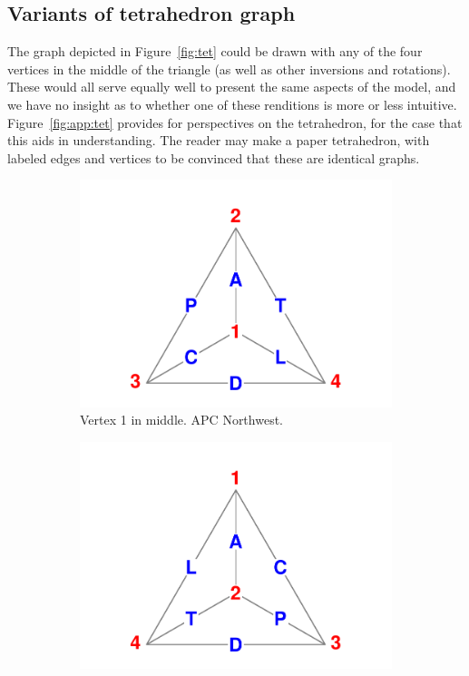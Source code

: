\documentclass[11pt,oneside]{article} %
\newcommand\vt[1]{\textcolor{rd}{#1}}
\newcommand\eg[1]{\textcolor{bl}{#1}}
\begin{document}
\begin{appendices}
\section{Variants of tetrahedron graph}
The graph depicted in Figure~\ref{fig:tet} could be drawn with any of the
four vertices in the middle of the triangle (as well as other inversions
and rotations).
These would all serve equally well to present the same aspects of the model, and
we have no insight as to whether one of these renditions is more or less
intuitive. Figure~\ref{fig:app:tet} provides for perspectives on the
tetrahedron, for the case that this aids in understanding. The reader may make a
paper tetrahedron, with labeled edges and vertices to be convinced that
these are identical graphs.
\begin{figure}
        \centering
        \caption{Some variants of the graph of the APCTDL tetrahedron.} 
         \label{fig:app:tet}
        \begin{subfigure}[b]{0.475\textwidth}
            \centering
            \includegraphics[width=\textwidth]{Figures/Tetra1.pdf}
           \caption{\small Vertex \vt{1} in middle. \eg{APC} Northwest.}
            \label{fig:tet1}
        \end{subfigure}
        \hfill
        \begin{subfigure}[b]{0.475\textwidth}  
            \centering 
            \includegraphics[width=\textwidth]{Figures/Tetra2.pdf}

\end{subfigure}
\end{figure}
\end{appendices}
\end{document}
